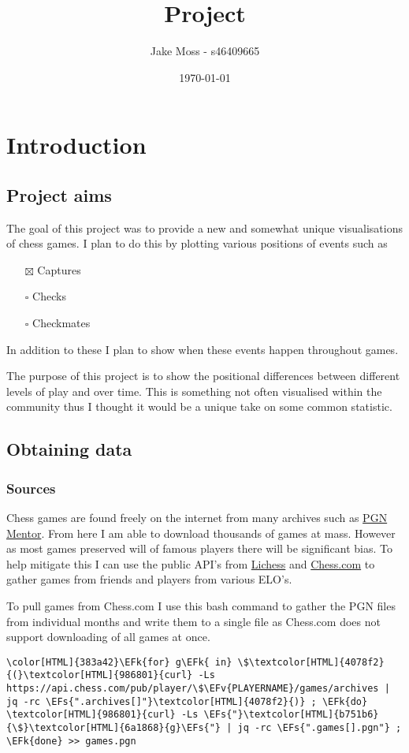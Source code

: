 \documentclass[11pt]{article}
\author{Jake Moss - s46409665}
\date{\today}
\title{Project}
\newcommand{\EFk}[1]{\textcolor{EFk}{#1}} %
\newcommand{\EFs}[1]{\textcolor{EFs}{#1}} %
\newcommand{\EFv}[1]{\textcolor{EFv}{#1}} %
\begin{document}
\maketitle
\tableofcontents


\section{Introduction}
\label{sec:org5be808b}
\subsection{Project aims}
\label{sec:orgcfceece}
The goal of this project was to provide a new and somewhat unique visualisations of chess games. I plan to do this by plotting various positions of events such as
\begin{itemize}
\item[{$\boxtimes$}] Captures
\item[{$\square$}] Checks
\item[{$\square$}] Checkmates
\end{itemize}
In addition to these I plan to show when these events happen throughout games.

The purpose of this project is to show the positional differences between different levels of play and over time. This is something not often visualised within the community thus I thought it would be a unique take on some common statistic.
\subsection{Obtaining data}
\label{sec:org47aa308}
\subsubsection{Sources}
\label{sec:org3da5936}
Chess games are found freely on the internet from many archives such as \href{https://www.pgnmentor.com/files.html}{PGN Mentor}. From here I am able to download thousands of games at mass. However as most games preserved will of famous players there will be significant bias. To help mitigate this I can use the public API's from \href{https://lichess.org/}{Lichess} and \href{https://www.chess.com/}{Chess.com} to gather games from friends and players from various ELO's.

To pull games from Chess.com I use this bash command to gather the PGN files from individual months and write them to a single file as Chess.com does not support downloading of all games at once.
\begin{Code}
\begin{Verbatim}[]
\color[HTML]{383a42}\EFk{for} g\EFk{ in} \$\textcolor[HTML]{4078f2}{(}\textcolor[HTML]{986801}{curl} -Ls https://api.chess.com/pub/player/\$\EFv{PLAYERNAME}/games/archives | jq -rc \EFs{".archives[]"}\textcolor[HTML]{4078f2}{)} ; \EFk{do} \textcolor[HTML]{986801}{curl} -Ls \EFs{"}\textcolor[HTML]{b751b6}{\$}\textcolor[HTML]{6a1868}{g}\EFs{"} | jq -rc \EFs{".games[].pgn"} ; \EFk{done} >> games.pgn
\end{Verbatim}
\end{Code}
\end{document}
